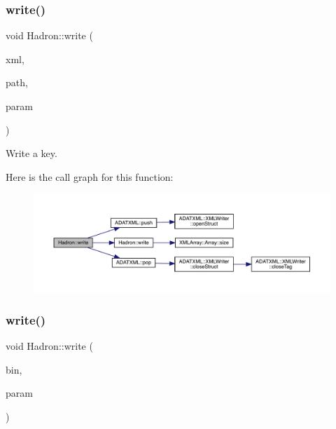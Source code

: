 \subsubsection{\texorpdfstring{write()}{write()}\hspace{0.1cm}{\footnotesize\ttfamily [25/95]}}
{\footnotesize\ttfamily void Hadron\+::write (\begin{DoxyParamCaption}\item[{\mbox{\hyperlink{classADATXML_1_1XMLWriter}{X\+M\+L\+Writer}} \&}]{xml,  }\item[{const std\+::string \&}]{path,  }\item[{const \mbox{\hyperlink{structHadron_1_1KeyGlueElementalOperator__t}{Key\+Glue\+Elemental\+Operator\+\_\+t}} \&}]{param }\end{DoxyParamCaption})}



Write a key. 

Here is the call graph for this function\+:
\nopagebreak
\begin{figure}[H]
\begin{center}
\leavevmode
\includegraphics[width=350pt]{d1/daf/namespaceHadron_a4ae7852bf18d56cb1a966ce318245ea6_cgraph}
\end{center}
\end{figure}
\mbox{\label{namespaceHadron_a1f7e7b8c782fddd330a9f4491bd37e22}} 
\subsubsection{\texorpdfstring{write()}{write()}\hspace{0.1cm}{\footnotesize\ttfamily [26/95]}}
{\footnotesize\ttfamily void Hadron\+::write (\begin{DoxyParamCaption}\item[{\mbox{\hyperlink{classADATIO_1_1BinaryWriter}{Binary\+Writer}} \&}]{bin,  }\item[{const \mbox{\hyperlink{structHadron_1_1KeyPeramDist__t}{Key\+Peram\+Dist\+\_\+t}} \&}]{param }\end{DoxyParamCaption})}



